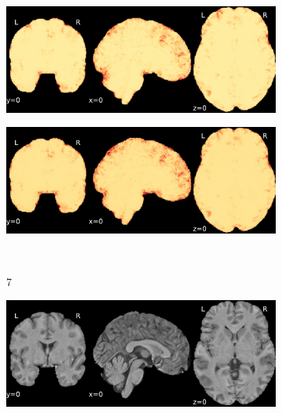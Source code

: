 \documentclass{article}
\begin{document}
\begin{appendices}
\begin{landscape}
\begin{figure}
\begin{subfigure}[t]{0.2\paperheight}
            \end{subfigure}
            \begin{subfigure}[t]{0.2\paperheight}
                \centering
                \includegraphics[width=\textwidth]{figures/sig/0mm/rs_ds001748_sub-adult16_sig.pdf}
            \end{subfigure}
            \begin{subfigure}[t]{0.2\paperheight}
                \centering
                \includegraphics[width=\textwidth]{figures/sig/0mm/rr.rs_ds001748_sub-adult16_sig.pdf}
            \end{subfigure} \\
            \begin{subfigure}[b][][c]{0.01\paperwidth} 7 \vspace*{15pt} \end{subfigure}
            \begin{subfigure}[t]{0.2\paperheight}
                \centering
                \includegraphics[width=\textwidth]{figures/sig/0mm/ieee_ds002338_sub-xp201.pdf}

\end{subfigure}
\end{figure}
\end{landscape}
\end{appendices}
\end{document}
